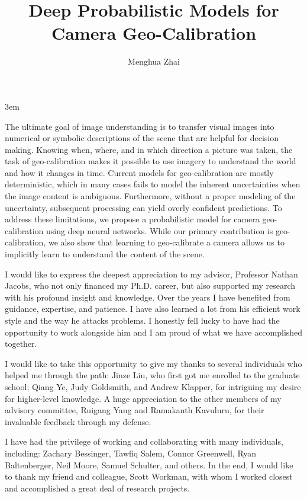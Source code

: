 \documentclass[final]{ukthesis}
\begin{document}
\emergencystretch 3em

\author{Menghua Zhai}
\title{Deep Probabilistic Models for Camera Geo-Calibration}

\abstract
{ \SingleSpacing
The ultimate goal of image understanding is to transfer visual
images into numerical or symbolic descriptions of the scene
that are helpful for decision making.
Knowing when, where, and in which direction a picture was taken, the
task of geo-calibration makes it possible to use imagery to understand
the world and how it changes in time. Current models for
geo-calibration are mostly deterministic, which in many cases fails to
model the inherent uncertainties when the image content is
ambiguous. Furthermore, without a proper modeling of the uncertainty, subsequent
processing can yield overly confident predictions.
To address these limitations, we propose a probabilistic model for
camera geo-calibration using deep neural networks.
While our primary contribution is geo-calibration, we also show that
learning to geo-calibrate a camera allows us to implicitly learn to
understand the content of the scene.
}


\frontmatter
\maketitle

\begin{acknowledgments}
  I would like to express the deepest appreciation to my advisor,
Professor Nathan Jacobs, who not only financed my Ph.D. career, but
also supported my research with his profound insight
and knowledge. Over the years I have benefited from guidance,
expertise, and patience. I have also learned a lot from his efficient
work style and the way he attacks problems. I honestly fell lucky to
have had the opportunity to work alongside him and I am proud of what
we have accomplished together.

I would like to take this opportunity to give my thanks to several
individuals who helped me through the path:  Jinze Liu, who
first got me enrolled to the graduate school; 
Qiang Ye, Judy Goldsmith, and Andrew Klapper, for intriguing
my desire for higher-level knowledge. A huge appreciation to the
other members of my advisory committee, Ruigang Yang and Ramakanth
Kavuluru, for their invaluable feedback through my defense.

I have had the privilege of working and collaborating with many
individuals, including: Zachary Bessinger, Tawfiq Salem, Connor
Greenwell, Ryan Baltenberger, Neil Moore, Samuel Schulter, and others.
In the end, I would like to thank my friend and colleague, Scott
Workman, with whom I worked closest and accomplished a great deal of
research projects.
\end{acknowledgments}
\end{document}
